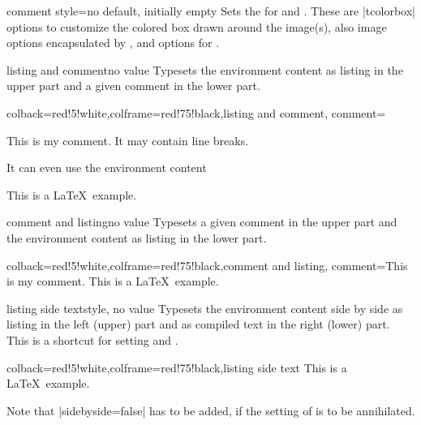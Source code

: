\begin{docTcbKey}[][doc new=2014-11-14]{comment style}{=}{no default, initially empty}
  Sets the  for  and .
  These are |tcolorbox| options to customize the colored box drawn around the
  image(s), also image options encapsulated by ,
  and  options for .
\end{docTcbKey}


\begin{docTcbKey}{listing and comment}{}{no value}
  Typesets the environment content as listing in the upper part and
  a given comment in the lower part.
\begin{dispExample}
\begin{tcblisting}{colback=red!5!white,colframe=red!75!black,listing and comment,
  comment={This is my comment. It may contain line breaks.\par
    It can even use the environment content
    \flqq\ignorespaces\tcbuselistingtext\unskip\frqq}}
This is a \LaTeX\ example.
\end{tcblisting}
\end{dispExample}
\end{docTcbKey}

\enlargethispage*{10mm}
\begin{docTcbKey}{comment and listing}{}{no value}
  Typesets a given comment in the upper part and
  the environment content as listing in the lower part.
\begin{dispExample}
\begin{tcblisting}{colback=red!5!white,colframe=red!75!black,comment and listing,
comment={This is my comment.}}
This is a \LaTeX\ example.
\end{tcblisting}
\end{dispExample}
\end{docTcbKey}


\clearpage
\begin{docTcbKey}{listing side text}{}{style, no value}
Typesets the environment content side by side as listing in the left (upper)
part and as compiled text in the right (lower) part.
This is a shortcut for setting  and .
\begin{dispExample}
\begin{tcblisting}{colback=red!5!white,colframe=red!75!black,listing side text}
This is a \LaTeX\ example.
\end{tcblisting}
\end{dispExample}
\begin{marker}
Note that |sidebyside=false| has to be added, if the setting of
 is to be annihilated.
\end{marker}
\end{docTcbKey}


